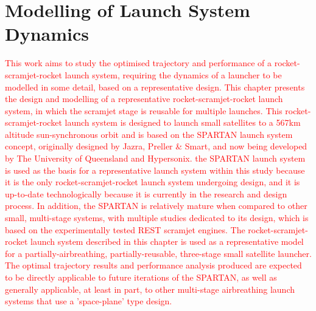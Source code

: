 
\cleardoublepage
\chapter{Modelling of Launch System Dynamics}\label{chapter:Design}

\textcolor{red}{This work aims to study the optimised trajectory and performance of a rocket-scramjet-rocket launch system, requiring the dynamics of a launcher to be modelled in some detail, based on a representative design.
	This chapter presents the design and modelling of a representative rocket-scramjet-rocket launch system, in which the scramjet stage is reusable for multiple launches. 
		This rocket-scramjet-rocket launch system is designed to launch small satellites to a 567km altitude sun-synchronous orbit and is based on the SPARTAN launch system concept, originally designed by Jazra, Preller \& Smart\cite{Preller2017b,Jazra2013}, and now being developed by The University of Queensland and Hypersonix.
		the SPARTAN launch system is used as the basis for a representative launch system within this study because it is the only rocket-scramjet-rocket launch system undergoing design, 
		 and it is up-to-date technologically because it is currently in the research and design process. In addition, the SPARTAN is relatively mature when compared to other small, multi-stage systems, with multiple studies dedicated to its design, which is based on the experimentally tested REST scramjet engines.   
	The rocket-scramjet-rocket launch system described in this chapter is used as a representative model for a partially-airbreathing, partially-reusable, three-stage small satellite launcher. The optimal trajectory results and performance analysis produced are expected to be directly applicable to future iterations of the SPARTAN, as well as generally applicable, at least in part, to other multi-stage airbreathing launch systems that use a 'space-plane' type design. }
	
